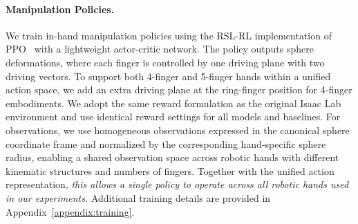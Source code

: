 

\vspace{-2mm}
\paragraph{Manipulation Policies.}
We train in-hand manipulation policies using the RSL-RL implementation of PPO~\cite{schwarke2025rslrl} with a lightweight actor-critic network. The policy outputs sphere deformations, where each finger is controlled by one driving plane with two driving vectors. To support both 4-finger and 5-finger hands within a unified action space, we add an extra driving plane at the ring-finger position for 4-finger embodiments. We adopt the same reward formulation as the original Isaac Lab~\cite{mittal2025isaaclab} environment and use identical reward settings for all models and baselines. For observations, we use homogeneous observations expressed in the canonical sphere coordinate frame and normalized by the corresponding hand-specific sphere radius, enabling a shared observation space across robotic hands with different kinematic structures and numbers of fingers. Together with the unified action representation, \emph{this allows a single policy to operate across all robotic hands used in our experiments.} Additional training details are provided in Appendix~\ref{appendix:training}.


